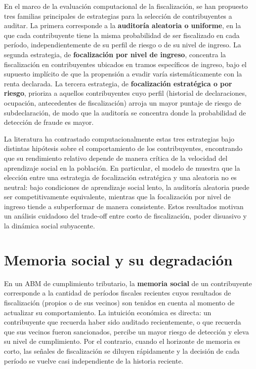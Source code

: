En el marco de la evaluación computacional de la fiscalización, se han propuesto tres familias principales de estrategias para la selección de contribuyentes a auditar. La primera corresponde a la \textbf{auditoría aleatoria o uniforme}, en la que cada contribuyente tiene la misma probabilidad de ser fiscalizado en cada período, independientemente de su perfil de riesgo o de su nivel de ingreso. La segunda estrategia, de \textbf{focalización por nivel de ingreso}, concentra la fiscalización en contribuyentes ubicados en tramos específicos de ingreso, bajo el supuesto implícito de que la propensión a evadir varía sistemáticamente con la renta declarada. La tercera estrategia, de \textbf{focalización estratégica o por riesgo}, prioriza a aquellos contribuyentes cuyo perfil (historial de declaraciones, ocupación, antecedentes de fiscalización) arroja un mayor puntaje de riesgo de subdeclaración, de modo que la auditoría se concentra donde la probabilidad de detección de fraude es mayor.

La literatura ha contrastado computacionalmente estas tres estrategias bajo distintas hipótesis sobre el comportamiento de los contribuyentes, encontrando que su rendimiento relativo depende de manera crítica de la velocidad del aprendizaje social en la población. En particular, el modelo de \textcite{canessa2025tax} muestra que la elección entre una estrategia de focalización estratégica y una aleatoria no es neutral: bajo condiciones de aprendizaje social lento, la auditoría aleatoria puede ser competitivamente equivalente, mientras que la focalización por nivel de ingreso tiende a subperformar de manera consistente. Estos resultados motivan un análisis cuidadoso del trade-off entre costo de fiscalización, poder disuasivo y la dinámica social subyacente.

\section{Memoria social y su degradación}
\label{sec:memoria-social}

En un ABM de cumplimiento tributario, la \textbf{memoria social} de un contribuyente corresponde a la cantidad de períodos fiscales recientes cuyos resultados de fiscalización (propios o de sus vecinos) son tenidos en cuenta al momento de actualizar su comportamiento. La intuición económica es directa: un contribuyente que recuerda haber sido auditado recientemente, o que recuerda que sus vecinos fueron sancionados, percibe un mayor riesgo de detección y eleva su nivel de cumplimiento. Por el contrario, cuando el horizonte de memoria es corto, las señales de fiscalización se diluyen rápidamente y la decisión de cada período se vuelve casi independiente de la historia reciente.

